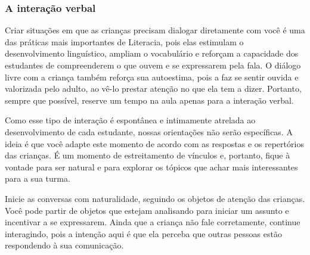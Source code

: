 \documentclass[11pt]{extarticle}
\begin{document}
\subsubsection{A interação verbal} 
Criar situações em que as crianças precisam dialogar diretamente com 
você é uma das práticas mais importantes de Literacia, pois elas estimulam 
o desenvolvimento linguístico, ampliam o vocabulário e reforçam a 
capacidade dos estudantes de compreenderem o que ouvem e se expressarem 
pela fala. O diálogo livre com a criança também reforça sua autoestima, pois 
a faz se sentir ouvida e valorizada pelo adulto, ao vê-lo prestar atenção 
no que ela tem a dizer. Portanto, sempre que possível, reserve um tempo na 
aula apenas para a interação verbal. 


Como esse tipo de interação é espontânea e intimamente atrelada ao 
desenvolvimento de cada estudante, nossas orientações não serão específicas. 
A ideia é que você adapte este momento de acordo com as respostas e os 
repertórios das crianças. É um momento de estreitamento de vínculos e, portanto, 
fique à vontade para ser natural e para explorar os tópicos que achar 
mais interessantes para a sua turma.

Inicie as conversas com naturalidade, seguindo os objetos de atenção das crianças. 
Você pode partir de objetos que estejam analisando
para iniciar um assunto e incentivar a se expressarem. Ainda que a
criança não fale corretamente, continue interagindo, 
pois a intenção aqui é que ela perceba que outras pessoas estão respondendo 
à sua comunicação. 
\end{document}
